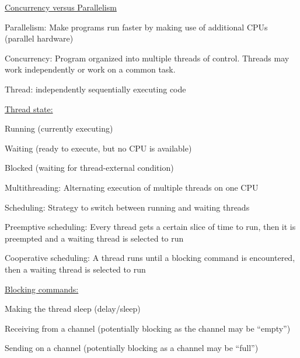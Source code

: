 \documentclass[landscape, a4paper]{article}
\begin{document}
\begin{minipage}[t]{0.2\linewidth}
	\begin{betterlist}
		\item \underline{Concurrency versus Parallelism}
		\begin{betterlist}
			\item \alert{Parallelism:} Make programs run faster by making use of additional CPUs (parallel hardware)
			\item \alert{Concurrency:} Program organized into multiple threads of control. Threads may work independently or work on a common task.
		\end{betterlist}
		\item \alert{Thread:} independently sequentially executing code
		\item \underline{Thread state:}
		\begin{betterlist}
			\item Running (currently executing)
			\item Waiting (ready to execute, but no CPU is available)
			\item Blocked (waiting for thread-external condition)
		\end{betterlist}
		\item \alert{Multithreading:} Alternating execution of multiple threads on one CPU
		\item \alert{Scheduling:} Strategy to switch between running and waiting threads
		\begin{betterlist}
			\item \alert{Preemptive scheduling:} Every thread gets a certain slice of time to run, then it is preempted and a waiting thread is selected to run
			\item \alert{Cooperative scheduling:} A thread runs until a blocking command is encountered, then a waiting thread is selected to run
		\end{betterlist}
	\end{betterlist}
	\fbox{Multi-threading}
	\begin{betterlist}
		\item \underline{Blocking commands:}
		\begin{betterlist}
			\item Making the thread sleep (delay/sleep)
			\item Receiving from a channel (potentially blocking as the channel may be \enquote{empty})
			\item Sending on a channel (potentially blocking as a channel may be \enquote{full})
		\end{betterlist}

\end{betterlist}
\end{minipage}
\end{document}
